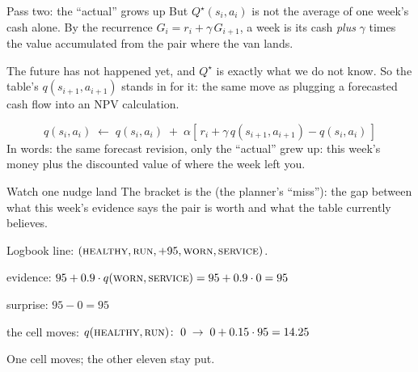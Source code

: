 \begin{frame}{Pass two: the ``actual'' grows up}
But $Q^\star(s_i, a_i)$ is not the average of one week's cash alone. By the recurrence $G_i = r_i + \gamma\, G_{i+1}$, a week is its cash \emph{plus} $\gamma$ times the value accumulated from the pair where the van lands.
\pause
\begin{bullets}
\item The future has not happened yet, and $Q^\star$ is exactly what we do not know. So the table's  $q(s_{i+1}, a_{i+1})$ stands in for it: the same move as plugging a forecasted cash flow into an NPV calculation.
\end{bullets}
\pause
\begin{lbox}
\[ q(s_i, a_i) \;\leftarrow\; q(s_i, a_i) \;+\; \alpha \left[\, r_i + \gamma\, q(s_{i+1}, a_{i+1}) - q(s_i, a_i) \,\right] \]
In words: the same forecast revision, only the ``actual'' grew up: this week's money plus the discounted value of where the week left you.
\end{lbox}
\end{frame}

\begin{frame}{Watch one nudge land}
The bracket is the  (the planner's ``miss''): the gap between what this week's evidence says the pair is worth and what the table currently believes.
\pause
\begin{examplebox}
Logbook line: $(\textsc{healthy}, \textsc{run}, +95, \textsc{worn}, \textsc{service})$.
\begin{bullets}
\item evidence: $95 + 0.9 \cdot q(\textsc{worn}, \textsc{service}) = 95 + 0.9 \cdot 0 = 95$
\item surprise: $95 - 0 = 95$
\item the cell moves: $q(\textsc{healthy}, \textsc{run})\colon\; 0 \;\to\; 0 + 0.15 \cdot 95 = 14.25$
\end{bullets}
One cell moves; the other eleven stay put.
\end{examplebox}
\end{frame}

